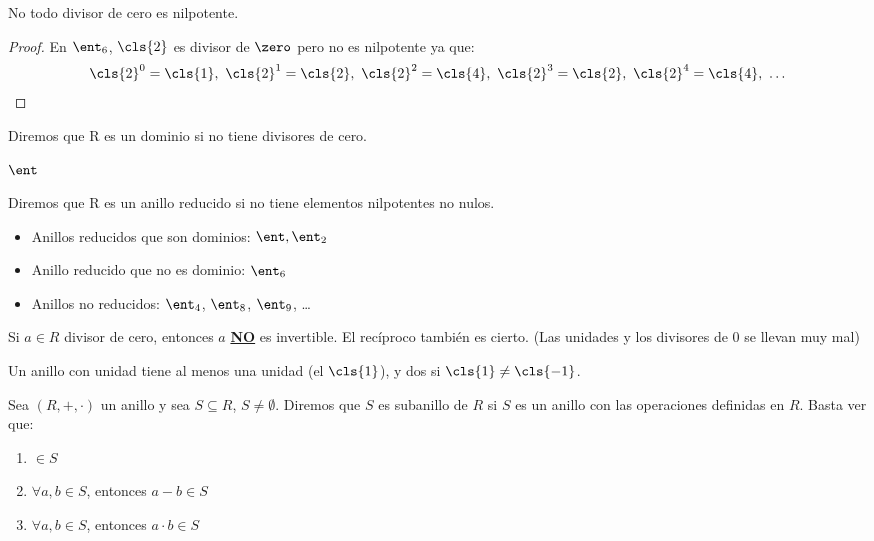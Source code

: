 \begin{lemma}
	No todo divisor de cero es nilpotente.
\end{lemma}

\begin{proof} %
	En $\ent_6$, $\cls{2}$ es divisor de $\zero$ pero no es nilpotente ya que:
	\begin{gather*}
		\cls{2}^0 = \cls{1}, \ \cls{2}^1 = \cls{2}, \ \cls{2}^2 = \cls{4}, \ \cls{2}^3 = \cls{2}, \ \cls{2}^4 = \cls{4}, \ \dots
	\end{gather*}
\end{proof}

\begin{defn}
Diremos que R es un dominio si no tiene divisores de cero.
\end{defn}

\begin{example}
	$\ent$
\end{example}

\begin{defn}
Diremos que R es un anillo reducido si no tiene elementos nilpotentes no nulos.
\end{defn}

\begin{example}
	\begin{itemize}
		\item Anillos reducidos que son dominios: $\ent, \ent_2$
		\item Anillo reducido que no es dominio: $\ent_6$
		\item Anillos no reducidos: $\ent_4$, $\ent_8$, $\ent_9$, \dots
	\end{itemize}
\end{example}


\obs Si $a \in R$ divisor de cero, entonces $a$ \underline{\bf NO} es invertible. El recíproco también es cierto. (Las unidades y los divisores de 0 se llevan muy mal)

\obs Un anillo con unidad tiene al menos una unidad (el $\cls{1}$), y dos si $\cls{1} \neq \cls{-1}$. %

\begin{defn}[Subanillo]
Sea $(R,+,\cdot)$ un anillo y sea $S \subseteq R$, $S \neq \emptyset$. Diremos que $S$ es subanillo de $R$ si $S$ es un anillo con las operaciones definidas en $R$. Basta ver que:
\begin{enumerate}
	\item \one $\in S$
	\item $\forall a,b \in S$, entonces $a-b \in S$
	\item $\forall a,b \in S$, entonces $a\cdot b \in S$
\end{enumerate}
\end{defn}




